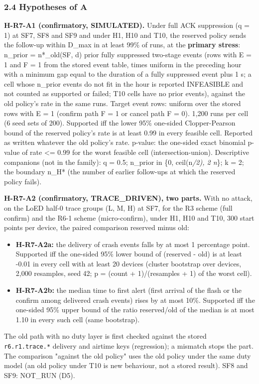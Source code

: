 \subsubsection*{2.4 Hypotheses of A}

\textbf{H-R7-A1 (confirmatory, SIMULATED).} Under full ACK suppression (q = 1) at SF7, SF8 and SF9 and under H1, H10 and T10, the reserved policy sends the follow-up within D\_max in at least 99\% of runs, at the \textbf{primary stress}: n\_prior = n*\_old(SF, d) prior fully suppressed two-stage events (rows with E = 1 and F = 1 from the stored event table, times uniform in the preceding hour with a minimum gap equal to the duration of a fully suppressed event plus 1 s; a cell whose n\_prior events do not fit in the hour is reported INFEASIBLE and not counted as supported or failed; T10 cells have no prior events), against the old policy's rate in the same runs. Target event rows: uniform over the stored rows with E = 1 (confirm path F = 1 or cancel path F = 0). 1,200 runs per cell (6 seed sets of 200). Supported iff the lower 95\% one-sided Clopper-Pearson bound of the reserved policy's rate is at least 0.99 in every feasible cell. Reported as written whatever the old policy's rate. p-value: the one-sided exact binomial p-value of rate <= 0.99 for the worst feasible cell (intersection-union).
Descriptive companions (not in the family): q = 0.5; n\_prior in \{0, ceil(n\emph{/2), 2 n}\}; k = 2; the boundary n\_H* (the number of earlier follow-ups at which the reserved policy fails).

\textbf{H-R7-A2 (confirmatory, TRACE\_DRIVEN), two parts.} With no attack, on the LoED half-0 trace groups (L, M, H) at SF7, for the R3 scheme (full confirm) and the R6-1 scheme (micro-confirm), under H1, H10 and T10, 300 start points per device, the paired comparison reserved minus old:
\begin{itemize}
\item \textbf{H-R7-A2a:} the delivery of crash events falls by at most 1 percentage point. Supported iff the one-sided 95\% lower bound of (reserved - old) is at least -0.01 in every cell with at least 20 devices (cluster bootstrap over devices, 2,000 resamples, seed 42; p = (count + 1)/(resamples + 1) of the worst cell).
\item \textbf{H-R7-A2b:} the median time to first alert (first arrival of the flash or the confirm among delivered crash events) rises by at most 10\%. Supported iff the one-sided 95\% upper bound of the ratio reserved/old of the median is at most 1.10 in every such cell (same bootstrap).
\end{itemize}
The old path with no duty layer is first checked against the stored \texttt{r6.r1.trace.*} delivery and airtime keys (regression); a mismatch stops the part. The comparison "against the old policy" uses the old policy under the same duty model (an old policy under T10 is new behaviour, not a stored result). SF8 and SF9: NOT\_RUN (D5).

